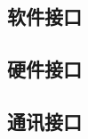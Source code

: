 \subsection{软件接口}
% 
% 
% 
% 
% 
% 
% 

\subsection{硬件接口}
% 
% 
% 
% 
%  


\subsection{通讯接口}
% 
% 
% 
